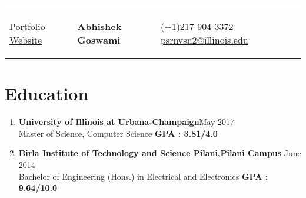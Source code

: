 \documentclass[resmargin,line]{res}
\makeatletter
\newcommand{\changeurlcolor}[1]{\hypersetup{urlcolor=#1}}
\def \address{\hspace*{-2.8cm}  Urbana\\  \hspace*{-2.8cm}  \changeurlcolor{blue}\href{https://github.com/domarps}{Portfolio Website}}
\def \author{\hspace*{-2.8cm} \textbf{{Abhishek Goswami}}}
\def \email{\href{mailto:psrnvsn2@illinois.edu}{psrnvsn2@illinois.edu}}
\def \phnum{(+1)217-904-3372}
\makeatother
\begin{document}
\vspace*{-1.45cm}

\begin{tabular} {
  p{}
  p{}
  p{}}
  \begin{flushleft}
     \address
  \end{flushleft}
  &
  \begin{center}
  \normalsize{\author}
  \end{center}
  &
  \begin{flushright}
    {\phnum}
      {\email}   
  \end{flushright}
\end{tabular}


\thispagestyle{plain} %

\section{\sc Education}
\begin{enumerate}[leftmargin=0.12cm, itemsep=2pt]
\item[] \textbf{University of Illinois at Urbana-Champaign}\hfill {{May 2017}} \\
 Master of Science, Computer Science \hfill {\textbf{GPA : 3.81/4.0}}

\item[] \textbf{Birla Institute of Technology and Science Pilani,Pilani Campus} \hfill {{June 2014}} \\
 Bachelor of Engineering (Hons.) in Electrical and Electronics \hfill {\textbf{GPA : 9.64/10.0}}
 \end{enumerate}
\end{document}
